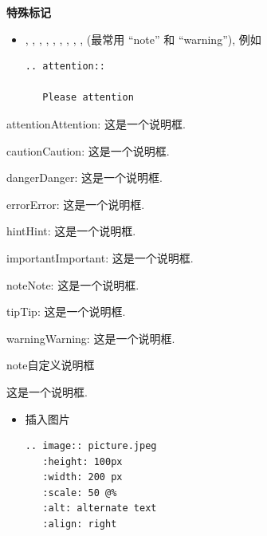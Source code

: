 \documentclass[letterpaper,10pt,english]{sphinxmanual}
\begin{document}
\textbf{特殊标记}
\begin{itemize}
\item {}
, , , , , , , , ,  (最常用 ``note'' 和 ``warning''), 例如

\begin{Verbatim}[commandchars=@\[\]]
.. attention::

   Please attention
\end{Verbatim}

\end{itemize}

\begin{notice}{attention}{Attention:}
这是一个说明框.
\end{notice}

\begin{notice}{caution}{Caution:}
这是一个说明框.
\end{notice}

\begin{notice}{danger}{Danger:}
这是一个说明框.
\end{notice}

\begin{notice}{error}{Error:}
这是一个说明框.
\end{notice}

\begin{notice}{hint}{Hint:}
这是一个说明框.
\end{notice}

\begin{notice}{important}{Important:}
这是一个说明框.
\end{notice}

\begin{notice}{note}{Note:}
这是一个说明框.
\end{notice}

\begin{notice}{tip}{Tip:}
这是一个说明框.
\end{notice}

\begin{notice}{warning}{Warning:}
这是一个说明框.
\end{notice}

\begin{notice}{note}{自定义说明框}

这是一个说明框.
\end{notice}
\begin{itemize}
\item {}
插入图片

\begin{Verbatim}[commandchars=@\[\]]
.. image:: picture.jpeg
   :height: 100px
   :width: 200 px
   :scale: 50 @%
   :alt: alternate text
   :align: right
\end{Verbatim}

\end{itemize}
\end{document}
